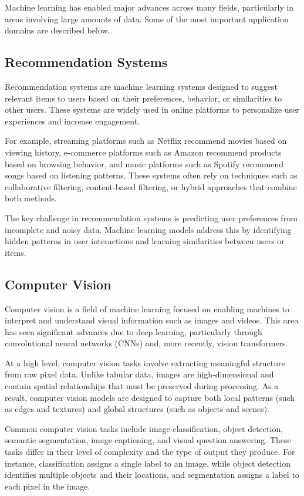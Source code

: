 \documentclass{article}
\begin{document}
Machine learning has enabled major advances across many fields, particularly in areas involving large amounts of data. Some of the most important application domains are described below.

\subsection{Recommendation Systems}

Recommendation systems are machine learning systems designed to suggest relevant items to users based on their preferences, behavior, or similarities to other users. These systems are widely used in online platforms to personalize user experiences and increase engagement.

For example, streaming platforms such as Netflix recommend movies based on viewing history, e-commerce platforms such as Amazon recommend products based on browsing behavior, and music platforms such as Spotify recommend songs based on listening patterns. These systems often rely on techniques such as collaborative filtering, content-based filtering, or hybrid approaches that combine both methods.

The key challenge in recommendation systems is predicting user preferences from incomplete and noisy data. Machine learning models address this by identifying hidden patterns in user interactions and learning similarities between users or items.

\subsection{Computer Vision}

Computer vision is a field of machine learning focused on enabling machines to interpret and understand visual information such as images and videos. This area has seen significant advances due to deep learning, particularly through convolutional neural networks (CNNs) and, more recently, vision transformers.

At a high level, computer vision tasks involve extracting meaningful structure from raw pixel data. Unlike tabular data, images are high-dimensional and contain spatial relationships that must be preserved during processing. As a result, computer vision models are designed to capture both local patterns (such as edges and textures) and global structures (such as objects and scenes).

Common computer vision tasks include image classification, object detection, semantic segmentation, image captioning, and visual question answering. These tasks differ in their level of complexity and the type of output they produce. For instance, classification assigns a single label to an image, while object detection identifies multiple objects and their locations, and segmentation assigns a label to each pixel in the image.
\end{document}
